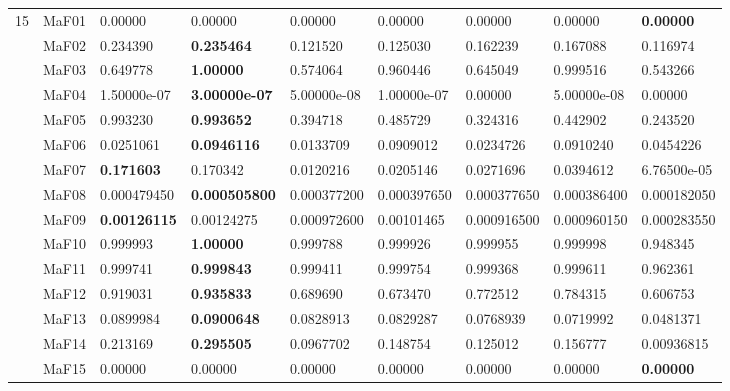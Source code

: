 \documentclass[]{article}
\begin{document}
\begin{landscape}
\begin{table}
\begin{footnotesize}
\begin{tabular}{|l|l|l|l|l|l|l|l|l|}
\multirow{15}{*}{15} & MaF01 & \cellcolor{gray95} 0.00000 & \cellcolor{gray95} 0.00000 & \cellcolor{gray95} 0.00000 & \cellcolor{gray95} 0.00000 & \cellcolor{gray95} 0.00000 & \cellcolor{gray95} 0.00000 & \cellcolor{gray95} {\bf 0.00000}\\
 & MaF02 & \cellcolor{gray95} 0.234390 & \cellcolor{gray95} {\bf 0.235464} & 0.121520 & 0.125030 & 0.162239 & 0.167088 & 0.116974\\
 & MaF03 & 0.649778 & \cellcolor{gray95} {\bf 1.00000} & 0.574064 & 0.960446 & 0.645049 & 0.999516 & 0.543266\\
 & MaF04 & \cellcolor{gray95} 1.50000e-07 & \cellcolor{gray95} {\bf 3.00000e-07} & \cellcolor{gray95} 5.00000e-08 & \cellcolor{gray95} 1.00000e-07 & \cellcolor{gray95} 0.00000 & \cellcolor{gray95} 5.00000e-08 & \cellcolor{gray95} 0.00000\\
 & MaF05 & \cellcolor{gray95} 0.993230 & \cellcolor{gray95} {\bf 0.993652} & 0.394718 & 0.485729 & 0.324316 & 0.442902 & 0.243520\\
 & MaF06 & 0.0251061 & \cellcolor{gray95} {\bf 0.0946116} & 0.0133709 & \cellcolor{gray95} 0.0909012 & 0.0234726 & \cellcolor{gray95} 0.0910240 & 0.0454226\\
 & MaF07 & \cellcolor{gray95} {\bf 0.171603} & \cellcolor{gray95} 0.170342 & 0.0120216 & 0.0205146 & 0.0271696 & 0.0394612 & 6.76500e-05\\
 & MaF08 & \cellcolor{gray95} 0.000479450 & \cellcolor{gray95} {\bf 0.000505800} & \cellcolor{gray95} 0.000377200 & \cellcolor{gray95} 0.000397650 & \cellcolor{gray95} 0.000377650 & 0.000386400 & 0.000182050\\
 & MaF09 & \cellcolor{gray95} {\bf 0.00126115} & \cellcolor{gray95} 0.00124275 & 0.000972600 & 0.00101465 & 0.000916500 & 0.000960150 & 0.000283550\\
 & MaF10 & \cellcolor{gray95} 0.999993 & \cellcolor{gray95} {\bf 1.00000} & 0.999788 & 0.999926 & 0.999955 & \cellcolor{gray95} 0.999998 & 0.948345\\
 & MaF11 & \cellcolor{gray95} 0.999741 & \cellcolor{gray95} {\bf 0.999843} & 0.999411 & \cellcolor{gray95} 0.999754 & 0.999368 & 0.999611 & 0.962361\\
 & MaF12 & \cellcolor{gray95} 0.919031 & \cellcolor{gray95} {\bf 0.935833} & 0.689690 & 0.673470 & 0.772512 & 0.784315 & 0.606753\\
 & MaF13 & \cellcolor{gray95} 0.0899984 & \cellcolor{gray95} {\bf 0.0900648} & 0.0828913 & 0.0829287 & 0.0768939 & 0.0719992 & 0.0481371\\
 & MaF14 & \cellcolor{gray95} 0.213169 & \cellcolor{gray95} {\bf 0.295505} & 0.0967702 & \cellcolor{gray95} 0.148754 & 0.125012 & \cellcolor{gray95} 0.156777 & 0.00936815\\
 & MaF15 & \cellcolor{gray95} 0.00000 & \cellcolor{gray95} 0.00000 & \cellcolor{gray95} 0.00000 & \cellcolor{gray95} 0.00000 & \cellcolor{gray95} 0.00000 & \cellcolor{gray95} 0.00000 & \cellcolor{gray95} {\bf 0.00000}\\
\hline
\end{tabular}
\end{footnotesize}
\end{table}
\end{landscape}
\end{document}
